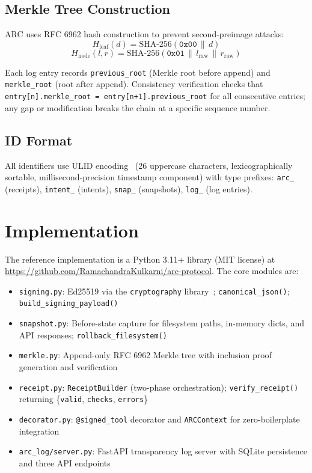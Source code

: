 \documentclass[10pt,twocolumn]{article}
\begin{document}
\subsection{Merkle Tree Construction}

ARC uses RFC 6962 hash construction to prevent second-preimage attacks:
\[
  H_{\text{leaf}}(d) = \text{SHA-256}(\texttt{0x00} \,\|\, d)
\]
\[
  H_{\text{node}}(l, r) = \text{SHA-256}(\texttt{0x01} \,\|\, l_{\text{raw}} \,\|\, r_{\text{raw}})
\]

Each log entry records \texttt{previous\_root} (Merkle root before append)
and \texttt{merkle\_root} (root after append). Consistency verification
checks that \texttt{entry[n].merkle\_root = entry[n+1].previous\_root}
for all consecutive entries; any gap or modification breaks the chain at
a specific sequence number.

\subsection{ID Format}

All identifiers use ULID encoding~\cite{ulid} (26 uppercase characters,
lexicographically sortable, millisecond-precision timestamp component) with
type prefixes: \texttt{arc\_} (receipts), \texttt{intent\_} (intents),
\texttt{snap\_} (snapshots), \texttt{log\_} (log entries).

\section{Implementation}

The reference implementation is a Python 3.11+ library (MIT license) at
\url{https://github.com/RamachandraKulkarni/arc-protocol}. The core modules are:

\begin{itemize}[noitemsep,topsep=2pt]
  \item \texttt{signing.py}: Ed25519 via the \texttt{cryptography}
    library~\cite{cryptography}; \texttt{canonical\_json()};
    \texttt{build\_signing\_payload()}
  \item \texttt{snapshot.py}: Before-state capture for filesystem paths,
    in-memory dicts, and API responses; \texttt{rollback\_filesystem()}
  \item \texttt{merkle.py}: Append-only RFC 6962 Merkle tree with
    inclusion proof generation and verification
  \item \texttt{receipt.py}: \texttt{ReceiptBuilder} (two-phase orchestration);
    \texttt{verify\_receipt()} returning \{\texttt{valid}, \texttt{checks},
    \texttt{errors}\}
  \item \texttt{decorator.py}: \texttt{@signed\_tool} decorator and
    \texttt{ARCContext} for zero-boilerplate integration
  \item \texttt{arc\_log/server.py}: FastAPI transparency log server with
    SQLite persistence and three API endpoints
\end{itemize}
\end{document}
